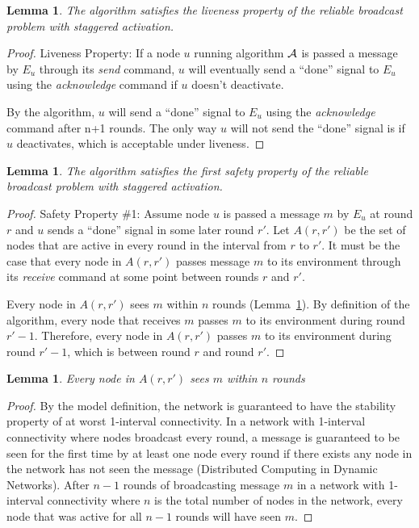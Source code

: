\documentclass[english]{article}
\newtheorem{lemma}[theorem]{Lemma}
\begin{document}
\begin{lemma}
\label{DeactivationRBLiveness}
The algorithm satisfies the liveness property of the reliable broadcast problem with staggered activation.
\end{lemma}
\begin{proof}
Liveness Property: If a node $u$ running algorithm $\cal A$ is passed a message by $E_u$ through its \textit{send} command, $u$ will eventually send  a ``done'' signal to $E_u$ using the \textit{acknowledge} command if $u$ doesn't deactivate.

By the algorithm, $u$ will send  a ``done'' signal to $E_u$ using the \textit{acknowledge} command after n+1 rounds. The only way $u$ will not send the ``done'' signal is if $u$ deactivates, which is acceptable under liveness.
\end{proof}

\begin{lemma}
\label{DeactivationRBSafety1}
The algorithm satisfies the first safety property of the reliable broadcast problem with staggered activation.
\end{lemma}
\begin{proof}
Safety Property \#1: Assume node $u$ is passed a message $m$ by $E_u$ at round $r$ and $u$ sends  a ``done'' signal in some later round $r'$. Let $A(r,r')$ be the set of nodes that are active in every round in the interval from $r$ to $r'$. It must be the case that every node in $A(r,r')$ passes message $m$ to its environment through its \textit{receive} command at some point between rounds $r$ and $r'$. 

Every node in $A(r,r')$ sees $m$ within $n$ rounds (Lemma~\ref{RBDeactivationReceive}). By definition of the algorithm, every node that receives $m$ passes $m$ to its environment during round $r'-1$. Therefore, every node in $A(r,r')$ passes $m$ to its environment during round $r'-1$, which is between round $r$ and round $r'$.

\end{proof}

\begin{lemma}
\label{RBDeactivationReceive}
Every node in $A(r,r')$ sees $m$ within $n$ rounds
\end{lemma}
\begin{proof}

By the model definition, the network is guaranteed to have the stability property of at worst 1-interval connectivity. In a network with 1-interval connectivity where nodes broadcast every round, a message is guaranteed to be seen for the first time by at least one node every round if there exists any node in the network has not seen the message (Distributed Computing in Dynamic Networks). After $n-1$ rounds of broadcasting message $m$ in a network with 1-interval connectivity where $n$ is the total number of nodes in the network, every node that was active for all $n-1$ rounds will have seen $m$.

\end{proof}
\end{document}
